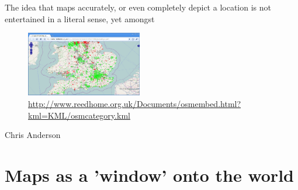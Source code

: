 \documentclass[11pt]{report}
\begin{document}


The idea that maps accurately, or even completely depict a location is not entertained in a literal sense, yet amongst


\begin{figure}
	\begin{flushright}
		\includegraphics[width=0.45\textwidth]{images/osm-missing-parts.png}
	\url{http://www.reedhome.org.uk/Documents/osmembed.html?kml=KML/osmcategory.kml}
	\end{flushright}
\end{figure}

Chris Anderson 

\section{Maps as a 'window' onto the world}
\end{document}
